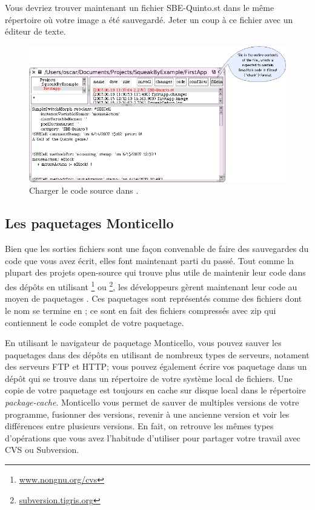 \documentclass[a4paper,10pt,twoside]{book}
\begin{document}
Vous devriez trouver maintenant un fichier SBE-Quinto.st dans le même répertoire où votre image a été sauvegardé.
Jeter un coup à ce fichier avec un éditeur de texte.


\begin{figure}[ht]
\centerline {\includegraphics[width=\textwidth]{FileIn}}
\caption{Charger le code source dans \squeak.
\label{fig:filein}}
\end{figure}

\subsection{Les paquetages Monticello}
Bien que les sorties fichiers sont une façon convenable de faire des sauvegardes du code que vous avez écrit, elles font maintenant parti du passé.
Tout comme la plupart des projets open-source qui trouve plus utile de maintenir leur code dans des dépôts en utilisant \footnote{\url{www.nongnu.org/cvs}} ou \footnote{\url{subversion.tigris.org}}, les développeurs \squeak gèrent maintenant leur code au moyen de paquetages . 
Ces paquetages sont représentés comme des fichiers dont le nom se termine en ; ce sont en fait des fichiers compressés avec zip qui contiennent le code complet de votre paquetage.

En utilisant le navigateur de paquetage Monticello, vous pouvez sauver les paquetages dans des dépôts en utilisant de nombreux types de serveurs, notament des serveurs FTP et HTTP; vous pouvez également écrire vos paquetage dans un dépôt qui se trouve dans un répertoire de votre système local de fichiers.
Une copie de votre paquetage est toujours en cache sur disque local dans le répertoire \emph{package-cache}. 
Monticello vous permet de sauver de multiples versions de votre programme, fusionner des versions, revenir à une ancienne version et voir les différences entre plusieurs versions.
En fait, on retrouve les mêmes types d'opérations que vous avez l'habitude d'utiliser pour partager votre travail avec CVS ou Subversion.
\end{document}
